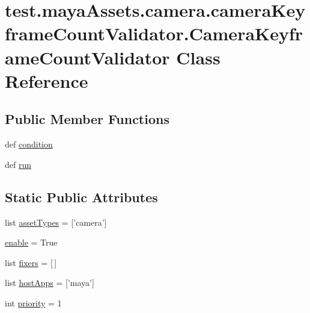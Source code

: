 \hypertarget{classtest_1_1mayaAssets_1_1camera_1_1cameraKeyframeCountValidator_1_1CameraKeyframeCountValidator}{\section{test.\-maya\-Assets.\-camera.\-camera\-Keyframe\-Count\-Validator.\-Camera\-Keyframe\-Count\-Validator \-Class \-Reference}
\label{dc/db7/classtest_1_1mayaAssets_1_1camera_1_1cameraKeyframeCountValidator_1_1CameraKeyframeCountValidator}
}
\subsection*{\-Public \-Member \-Functions}
\begin{DoxyCompactItemize}
\item 
def \hyperlink{classtest_1_1mayaAssets_1_1camera_1_1cameraKeyframeCountValidator_1_1CameraKeyframeCountValidator_af69c67742f6e6c3d45d3d7d745a7026a}{condition}
\item 
def \hyperlink{classtest_1_1mayaAssets_1_1camera_1_1cameraKeyframeCountValidator_1_1CameraKeyframeCountValidator_a4ffe57479a30b6bb67d24672ed754afd}{run}
\end{DoxyCompactItemize}
\subsection*{\-Static \-Public \-Attributes}
\begin{DoxyCompactItemize}
\item 
list \hyperlink{classtest_1_1mayaAssets_1_1camera_1_1cameraKeyframeCountValidator_1_1CameraKeyframeCountValidator_a8e1f7136544a845996c98395fe868c43}{asset\-Types} = \mbox{[}'camera'\mbox{]}
\item 
\hyperlink{classtest_1_1mayaAssets_1_1camera_1_1cameraKeyframeCountValidator_1_1CameraKeyframeCountValidator_a98c17e4d835e719b2fc105c1e58f7206}{enable} = \-True
\item 
list \hyperlink{classtest_1_1mayaAssets_1_1camera_1_1cameraKeyframeCountValidator_1_1CameraKeyframeCountValidator_ad242990910ac550455425ebb11a63319}{fixers} = \mbox{[}$\,$\mbox{]}
\item 
list \hyperlink{classtest_1_1mayaAssets_1_1camera_1_1cameraKeyframeCountValidator_1_1CameraKeyframeCountValidator_a90a1ccc3c9491211d9f8951d4b413d7f}{host\-Apps} = \mbox{[}'maya'\mbox{]}
\item 
int \hyperlink{classtest_1_1mayaAssets_1_1camera_1_1cameraKeyframeCountValidator_1_1CameraKeyframeCountValidator_a0d61dfd554b9b08507c8626e0ca92026}{priority} = 1
\end{DoxyCompactItemize}


